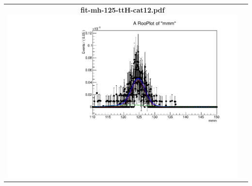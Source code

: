 \begin{longtable}{|c|c|}
{}
 \\
\hline
\parbox{0.49\textwidth}{
\centering
{\bfseries fit-mh-125-ttH-cat12.pdf}
\includegraphics[width=.49\textwidth]{figures/signal_model/AppendixBdt/ttH/125/fit_mh_125_ttH_cat12.pdf}
}
 & \\ \hline
\end{longtable}
